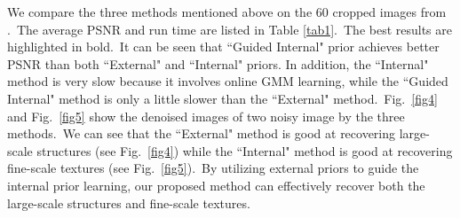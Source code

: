 \documentclass[10pt,twocolumn,letterpaper]{article}
\begin{document}
We compare the three methods mentioned above on the 60 cropped images from \cite{crosschannel2016}.\ The average PSNR and run time are listed in Table \ref{tab1}.\ The best results are highlighted in bold.\ It can be seen that ``Guided Internal" prior achieves better PSNR than both ``External" and ``Internal" priors. In addition, the ``Internal" method is very slow because it involves online GMM learning, while the ``Guided Internal" method is only a little slower than the ``External" method.\ Fig.\ \ref{fig4} and Fig.\ \ref{fig5} show the denoised images of two noisy image by the three methods.\ We can see that the  ``External" method is good at recovering large-scale structures (see Fig.\ \ref{fig4}) while the ``Internal" method is good at recovering fine-scale textures (see Fig.\ \ref{fig5}).\ By utilizing external priors to guide the internal prior learning, our proposed method can effectively recover both the large-scale structures and fine-scale textures. 
\end{document}
